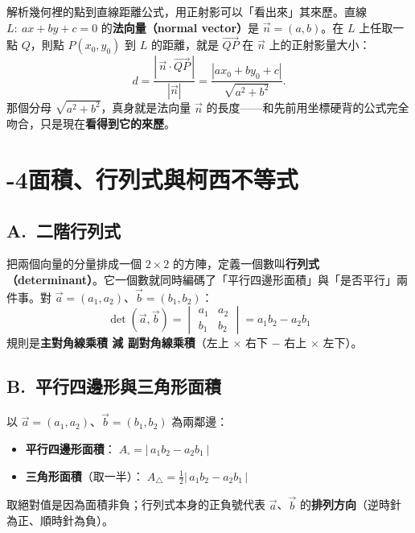 \documentclass[11pt]{article}
\begin{document}
解析幾何裡的點到直線距離公式，用正射影可以「看出來」其來歷。直線 $L:\ ax+by+c=0$ 的\textbf{法向量（normal vector）}是 $\vec n=(a,b)$。在 $L$ 上任取一點 $Q$，則點 $P(x_0,y_0)$ 到 $L$ 的距離，就是 $\overrightarrow{QP}$ 在 $\vec n$ 上的正射影量大小：
$$d=\frac{|\,\vec n\cdot\overrightarrow{QP}\,|}{|\vec n|}=\frac{|ax_0+by_0+c|}{\sqrt{a^2+b^2}}.$$
那個分母 $\sqrt{a^2+b^2}$，真身就是法向量 $\vec n$ 的長度——和先前用坐標硬背的公式完全吻合，只是現在\textbf{看得到它的來歷}。

\section*{-4\quad 面積、行列式與柯西不等式}

\subsection*{\sffamily A.\ 二階行列式}

把兩個向量的分量排成一個 $2\times2$ 的方陣，定義一個數叫\textbf{行列式（determinant）}。它一個數就同時編碼了「平行四邊形面積」與「是否平行」兩件事。對 $\vec a=(a_1,a_2)$、$\vec b=(b_1,b_2)$：
$$\boxed{\;\det(\vec a,\vec b)=\begin{vmatrix} a_1 & a_2\\ b_1 & b_2\end{vmatrix}=a_1 b_2-a_2 b_1\;}$$
規則是\textbf{主對角線乘積 減 副對角線乘積}（左上 $\times$ 右下 $-$ 右上 $\times$ 左下）。

\subsection*{\sffamily B.\ 平行四邊形與三角形面積}

以 $\vec a=(a_1,a_2)$、$\vec b=(b_1,b_2)$ 為兩鄰邊：

\begin{itemize}\setlength{\itemsep}{2pt}
\item \textbf{平行四邊形面積}：$\displaystyle\boxed{\;A_{\square}=\bigl|\,a_1 b_2-a_2 b_1\,\bigr|\;}$
\item \textbf{三角形面積}（取一半）：$\displaystyle\boxed{\;A_{\triangle}=\frac12\bigl|\,a_1 b_2-a_2 b_1\,\bigr|\;}$
\end{itemize}

取絕對值是因為面積非負；行列式本身的正負號代表 $\vec a$、$\vec b$ 的\textbf{排列方向}（逆時針為正、順時針為負）。

\end{document}
